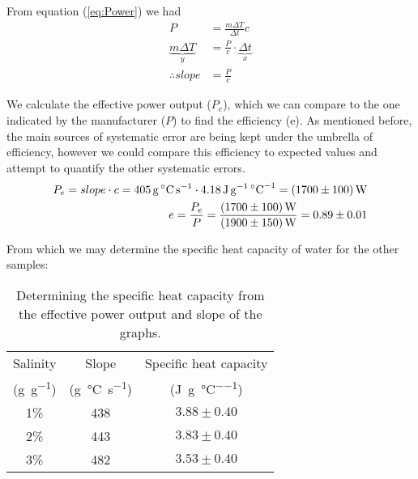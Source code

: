 From equation (\ref{eq:Power}) we had
\begin{equation*}
\begin{split}
P &= \frac{m\Delta T}{\Delta t}c\\
{\underbrace{\textstyle
		m\Delta T
	}_{y}} &= \frac{P}{c} \cdot
{\underbrace{\textstyle
		\Delta t
	}_{x}} \\
\therefore slope &= \frac{P}{c}
\end{split}
\end{equation*}

We calculate the effective power output ($P_e$), which we can compare to the one indicated by the manufacturer ($P$) to find the efficiency (e). As mentioned before, the main sources of systematic error are being kept under the umbrella of efficiency, however we could compare this efficiency to expected values and attempt to quantify the other systematic errors.
\begin{equation}\begin{split}
	P_e = slope \cdot c = \SI{405}{\gram\celsius\per\second} \cdot \SI{4.18}{\joule\per\gram\per\celsius} = \SI{1700 \pm 100}{\watt} \\
	e=\frac{P_e}{P} = \frac{ \SI{1700 \pm 100}{\watt} }{ \SI{1900 \pm 150}{\watt} } = 0.89 \pm 0.01
\end{split}
\end{equation}

From which we may determine the specific heat capacity of water for the other samples:

\begin{table}[h] \centering
\begin{tabular}{ccc} 
	Salinity & Slope  & Specific heat capacity \\
	(\si{\gram\per\gram}) & (\si{\gram\celsius\per\second})	& (\si{\joule\per\gram\per\celsius}) \\ \hline
	1\%	& 438 &	 $3.88\pm 0.40$\\
	2\%	& 443 & $3.83\pm 0.40$\\
	3\% & 482 & $3.53\pm 0.40$\\
\end{tabular}
\caption{Determining the specific heat capacity from the effective power output and slope of the graphs.}
\end{table}